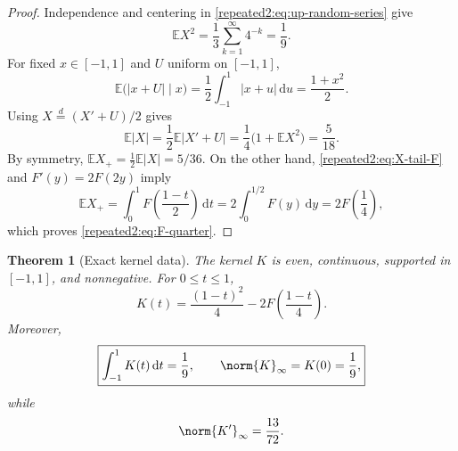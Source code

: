 \documentclass[11pt,oneside]{article}
\newtheorem{theorem}{Theorem}[section]
\theoremstyle{definition}
\theoremstyle{remark}
\newcommand{\dd}{\,\mathrm d}
\newcommand{\E}{\mathbb E}
\begin{document}
\begin{proof}
Independence and centering in \eqref{repeated2:eq:up-random-series} give
\[
 \E X^2=\frac13\sum_{k=1}^{\infty}4^{-k}=\frac19.
\]
For fixed $x\in[-1,1]$ and $U$ uniform on $[-1,1]$,
\[
 \E\bigl(|x+U|\mid x\bigr)=\frac12\int_{-1}^{1}|x+u|\dd u
 =\frac{1+x^2}{2}.
\]
Using $X\stackrel d=(X'+U)/2$ gives
\[
 \E|X|=\frac12\E|X'+U|
 =\frac14\bigl(1+\E X^2\bigr)=\frac5{18}.
\]
By symmetry, $\E X_+=\frac12\E|X|=5/36$.  On the other hand,
\eqref{repeated2:eq:X-tail-F} and $F'(y)=2F(2y)$ imply
\[
 \E X_+=\int_0^1F\left(\frac{1-t}{2}\right)\dd t
 =2\int_0^{1/2}F(y)\dd y=2F\left(\frac14\right),
\]
which proves \eqref{repeated2:eq:F-quarter}.
\end{proof}

\begin{theorem}[Exact kernel data]
\label{repeated2:thm:kernel-data}
The kernel $K$ is even, continuous, supported in $[-1,1]$, and nonnegative.  For
$0\le t\le1$,
\begin{equation}
 K(t)=\frac{(1-t)^2}{4}-2F\left(\frac{1-t}{4}\right).
 \label{repeated2:eq:K-explicit}
\end{equation}
Moreover,
\begin{equation}
 \boxed{\displaystyle
 \int_{-1}^{1}K(t)\dd t=\frac19,
 \qquad
 \norm{K}_\infty=K(0)=\frac19,}
 \label{repeated2:eq:K-mass-and-max}
\end{equation}
while
\begin{equation}
 \norm{K'}_\infty=\frac{13}{72}.
 \label{repeated2:eq:Kprime-max}
\end{equation}
\end{theorem}
\end{document}

